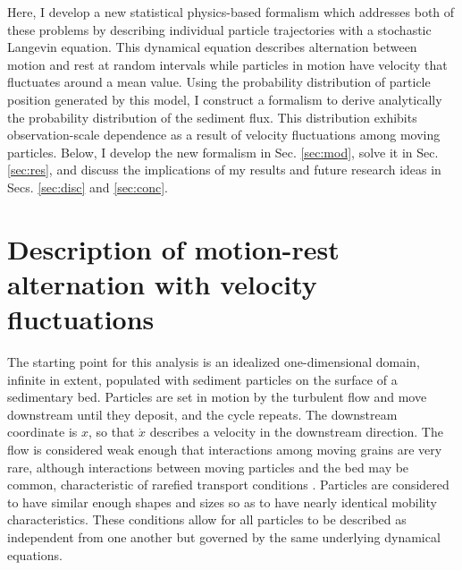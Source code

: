Here, I develop a new statistical physics-based formalism which addresses both of these problems by describing individual particle trajectories with a stochastic Langevin equation.
This dynamical equation describes alternation between motion and rest at random intervals while particles in motion have velocity that fluctuates around a mean value.
Using the probability distribution of particle position generated by this model, I construct a formalism to derive analytically the probability distribution of the sediment flux.
This distribution exhibits observation-scale dependence as a result of velocity fluctuations among moving particles.
Below, I develop the new formalism in Sec. \ref{sec:mod}, solve it in Sec. \ref{sec:res}, and discuss the implications of my results and future research ideas in Secs. \ref{sec:disc} and \ref{sec:conc}.

\section{Description of motion-rest alternation with velocity fluctuations \label{sec:mod}}
The starting point for this analysis is an idealized one-dimensional domain, infinite in extent, populated with sediment particles on the surface of a sedimentary bed.
Particles are set in motion by the turbulent flow and move downstream until they deposit, and the cycle repeats.
The downstream coordinate is $x$, so that $\dot{x}$ describes a velocity in the downstream direction.
The flow is considered weak enough that interactions among moving grains are very rare, although interactions between moving particles and the bed may be common, characteristic of rarefied transport conditions \citep[e.g.][]{Kumaran2006,Furbish2017}. 
Particles are considered to have similar enough shapes and sizes so as to have nearly identical mobility characteristics.
These conditions allow for all particles to be described as independent from one another but governed by the same underlying dynamical equations.

